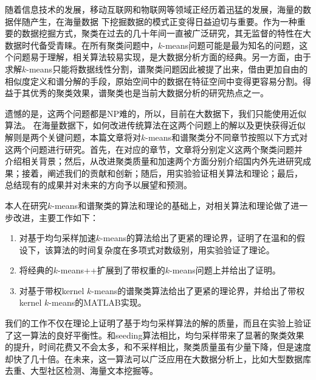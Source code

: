 	
\begin{chineseabstract}
随着信息技术的发展，移动互联网和物联网等领域正经历着迅猛的发展，海量的数据伴随产生，在海量数据
下挖掘数据的模式正变得日益迫切与重要。作为一种重要的数据挖掘方式，聚类在过去的几十年间一直被广泛研究，其无监督的特性在大数据时代备受青睐。在所有聚类问题中，$k$-means问题可能是最为知名的问题，这个问题易于理解，相关算法较易实现，是大数据分析方面的经典。另一方面，由于求解$k$-means只能将数据线性分割，谱聚类问题因此被提了出来，借由更加自由的相似度定义和谱分解的手段，原始空间中的数据在特征空间中变得更容易分割。得益于其优秀的聚类效果，谱聚类也是当前大数据分析的研究热点之一。

遗憾的是，这两个问题都是NP难的，所以，目前在大数据下，我们只能使用近似算法。
在海量数据下，如何改进传统算法在这两个问题上的解以及更快获得近似解则是两个关键问题，本篇文章将对$k$-means和谱聚类分不同章节按照以下方式对这两个问题进行研究。首先，在对应的章节，文章将分别定义这两个聚类问题并
介绍相关背景；然后，从改进聚类质量和加速两个方面分别介绍国内外先进研究成果；接着，阐述我们的贡献和创新；随后，用实验验证相关算法和理论；最后， 总结现有的成果并对未来的方向予以展望和预测。

本人在研究$k$-means和谱聚类的算法和理论的基础上，对相关算法和理论做了进一步改进，主要工作如下：
\begin{enumerate}
	\item 对基于均匀采样加速$k$-means的算法给出了更紧的理论界，证明了在温和的假设下，该算法的时间复杂度在多项式对数级别，用实验验证了理论。
	\item 将经典的$k$-means++扩展到了带权重的$k$-means问题上并给出了证明。
	\item 对基于带权kernel $k$-means的谱聚类算法给出了更紧的理论界，并给出了带权kernel $k$-means的MATLAB实现。
\end{enumerate}

我们的工作不仅在理论上证明了基于均匀采样算法的解的质量，而且在实验上验证了这一算法的良好平衡性。和seeding算法相比，均匀采样带来了显著的聚类效果的提升，时间花费又不会太多，和不采样相比，聚类质量虽有少量下降，但是速度却快了几十倍。在未来，这一算法可以广泛应用在大数据分析上，比如大型数据库去重、大型社区检测、海量文本挖掘等。

\end{chineseabstract}

